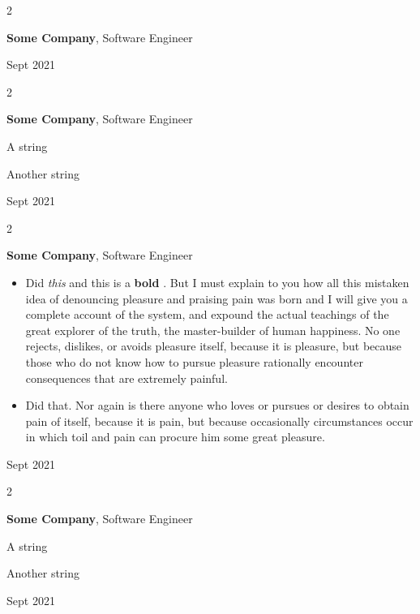 \documentclass[10pt, letterpaper]{article}
\newenvironment{summary}{
    \begin{description}[
        topsep=0.10 cm,
        parsep=0.10 cm,
        partopsep=0pt,
        itemsep=0pt,
        leftmargin=0.4 cm + 10pt
    ]
}{
    \end{description}
} %
\newenvironment{highlights}{
    \begin{itemize}[
        topsep=0.10 cm,
        parsep=0.10 cm,
        partopsep=0pt,
        itemsep=0pt,
        leftmargin=0.4 cm + 10pt
    ]
}{
    \end{itemize}
} %
\newenvironment{twocolentry}[2][]{
    \onecolentry
    \def\secondColumn{#2}
    \setcolumnwidth{\fill, 4.5 cm}
    \begin{paracol}{2}
}{
    \switchcolumn \raggedleft \secondColumn
    \end{paracol}
    \endonecolentry
} %
\let\hrefWithoutArrow\href
\renewcommand{\href}[2]{\hrefWithoutArrow{#1}{\ifthenelse{\equal{#2}{}}{ }{#2 }\raisebox{.15ex}{\footnotesize \faExternalLink*}}}
\begin{document}
        \vspace{0.2 cm}

        \begin{twocolentry}{
            Sept 2021
        }
            \textbf{Some \textnormal{Company}}, Software Engineer
        \end{twocolentry}


        \vspace{0.2 cm}

        \begin{twocolentry}{
            Sept 2021
        }
            \textbf{Some \textnormal{Company}}, Software Engineer
            \begin{summary}
                \item A string
                \item Another string
            \end{summary}
        \end{twocolentry}


        \vspace{0.2 cm}

        \begin{twocolentry}{
            Sept 2021
        }
            \textbf{Some \textnormal{Company}}, Software Engineer
            \begin{highlights}
                \item Did \textit{this} and this is a \textbf{bold} \href{https://example.com}{link}. But I must explain to you how all this mistaken idea of denouncing pleasure and praising pain was born and I will give you a complete account of the system, and expound the actual teachings of the great explorer of the truth, the master-builder of human happiness. No one rejects, dislikes, or avoids pleasure itself, because it is pleasure, but because those who do not know how to pursue pleasure rationally encounter consequences that are extremely painful.
                \item Did that. Nor again is there anyone who loves or pursues or desires to obtain pain of itself, because it is pain, but because occasionally circumstances occur in which toil and pain can procure him some great pleasure.
            \end{highlights}
        \end{twocolentry}


        \vspace{0.2 cm}

        \begin{twocolentry}{
            Sept 2021
        }
            \textbf{Some \textnormal{Company}}, Software Engineer
            \begin{summary}
                \item A string
                \item Another string
            \end{summary}
        \end{twocolentry}
\end{document}
